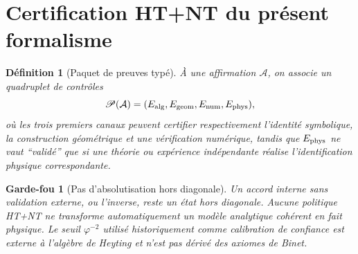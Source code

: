 \documentclass[11pt,a4paper]{article}
\newtheorem{definition}[theorem]{Définition}
\newtheorem{guardrail}[theorem]{Garde-fou}
\newcommand{\ph}{\varphi}
\begin{document}
\section{Certification HT+NT du présent formalisme}

\begin{definition}[Paquet de preuves typé]
À une affirmation $\mathcal A$, on associe un quadruplet de contrôles
\[
 \mathscr P(\mathcal A)=(E_{\rm alg},E_{\rm geom},E_{\rm num},E_{\rm phys}),
\]
où les trois premiers canaux peuvent certifier respectivement l'identité symbolique, la construction géométrique et une vérification numérique, tandis que $E_{\rm phys}$ ne vaut ``validé'' que si une théorie ou expérience indépendante réalise l'identification physique correspondante.
\end{definition}

\begin{guardrail}[Pas d'absolutisation hors diagonale]
Un accord interne sans validation externe, ou l'inverse, reste un état hors diagonale. Aucune politique HT+NT ne transforme automatiquement un modèle analytique cohérent en fait physique. Le seuil $\ph^{-2}$ utilisé historiquement comme calibration de confiance est externe à l'algèbre de Heyting et n'est pas dérivé des axiomes de Binet.
\end{guardrail}
\end{document}
